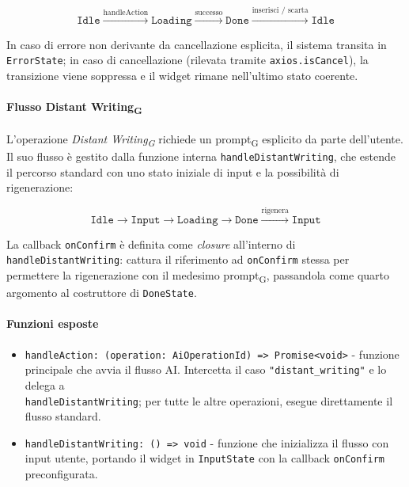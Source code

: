\documentclass[11pt,a4paper]{article}
\newcommand{\gls}[1]{#1\textsubscript{G}}
\begin{document}
\begin{equation*}
\texttt{Idle} \xrightarrow{\text{handleAction}} \texttt{Loading} \xrightarrow{\text{successo}} \texttt{Done} \xrightarrow{\text{inserisci / scarta}} \texttt{Idle}
\end{equation*}

In caso di errore non derivante da cancellazione esplicita, il sistema transita in \texttt{ErrorState}; in caso di cancellazione (rilevata tramite \texttt{axios.isCancel}), la transizione viene soppressa e il widget rimane nell'ultimo stato coerente.

\paragraph{Flusso \gls{Distant Writing}}
L'operazione \textit{\gls{Distant Writing}} richiede un \gls{prompt} esplicito da parte dell'utente. Il suo flusso è gestito dalla funzione interna \texttt{handleDistantWriting}, che estende il percorso standard con uno stato iniziale di input e la possibilità di rigenerazione:

\begin{equation*}
\texttt{Idle} \to \texttt{Input} \to \texttt{Loading} \to \texttt{Done} \xrightarrow{\text{rigenera}} \texttt{Input}
\end{equation*}

La callback \texttt{onConfirm} è definita come \textit{closure} all'interno di \texttt{handleDistantWriting}: cattura il riferimento ad \texttt{onConfirm} stessa per permettere la rigenerazione con il medesimo \gls{prompt}, passandola come quarto argomento al costruttore di \texttt{DoneState}.

\paragraph{Funzioni esposte}
\begin{itemize}
    \item \texttt{handleAction: (operation: AiOperationId) => Promise<void>} - funzione principale che avvia il flusso AI. Intercetta il caso \texttt{"distant\_writing"} e lo delega a \\ \texttt{handleDistantWriting}; per tutte le altre operazioni, esegue direttamente il flusso standard.
    \item \texttt{handleDistantWriting: () => void} - funzione che inizializza il flusso con input utente, portando il widget in \texttt{InputState} con la callback \texttt{onConfirm} preconfigurata.
\end{itemize}
\end{document}
